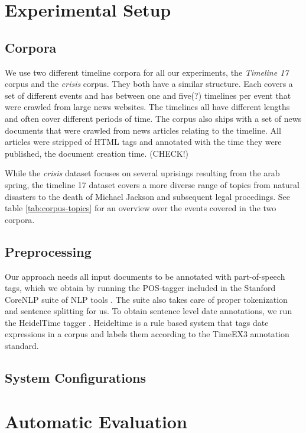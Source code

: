 \documentclass[a4paper,BCOR=10mm]{report}
\begin{document}
\chapter{Experimental Setup}

\section{Corpora}

We use two different timeline corpora for all our experiments, the \textit{Timeline 17} corpus \citet{tran-tl17} and the \textit{crisis} corpus. They both have a similar structure. Each covers a set of different events and has between one and five(?) timelines per event that were crawled from large news websites. The timelines all have different lengths and often cover different periods of time. The corpus also ships with a set of news documents that were crawled from news articles relating to the timeline. All articles were stripped of HTML tags and annotated with the time they were published, the document creation time. (CHECK!)

While the \textit{crisis} dataset focuses on several uprisings resulting from the arab spring, the timeline 17 dataset covers a more diverse range of topics from natural disasters to the death of Michael Jackson and subsequent legal procedings. See table \ref{tab:corpus-topics} for an overview over the events covered in the two corpora.

\section{Preprocessing}

Our approach needs all input documents to be annotated with part-of-speech tags, which we obtain by running the POS-tagger included in the Stanford CoreNLP suite of NLP tools \citep{stanford-corenlp}. The suite also takes care of proper tokenization and sentence splitting for us.
To obtain sentence level date annotations, we run the HeidelTime tagger \citet{heideltime}. Heideltime is a rule based system that tags date expressions in a corpus and labels them according to the TimeEX3 annotation standard.

\section{System Configurations}


\chapter{Automatic Evaluation}
\end{document}
